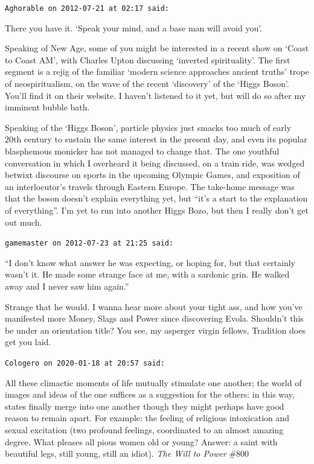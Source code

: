 \begin{footnotesize}
\begin{sffamily}
\texttt{Aghorable on 2012-07-21 at 02:17 said:}

There you have it. `Speak your mind, and a base man will avoid you'.

Speaking of New Age, some of you might be interested in a recent show on `Coast to Coast AM', with Charles Upton discussing `inverted spirituality'. The first segment is a rejig of the familiar `modern science approaches ancient truths' trope of neospiritualism, on the wave of the recent `discovery' of the `Higgs Boson'. You'll find it on their website. I haven't listened to it yet, but will do so after my imminent bubble bath.

Speaking of the `Higgs Boson', particle physics just smacks too much of early 20th century to sustain the same interest in the present day, and even its popular blasphemous monicker has not managed to change that. The one youthful conversation in which I overheard it being discussed, on a train ride, was wedged betwixt discourse on sports in the upcoming Olympic Games, and exposition of an interlocutor's travels through Eastern Europe. The take-home message was that the boson doesn't explain everything yet, but ``it's a start to the explanation of everything''. I'm yet to run into another Higgs Bozo, but then I really don't get out much.

\hfill

\texttt{gamemaster on 2012-07-23 at 21:25 said:}

``I don't know what answer he was expecting, or hoping for, but that certainly wasn't it. He made some strange face at me, with a sardonic grin. He walked away and I never saw him again.''

Strange that he would. I wanna hear more about your tight ass, and how you've manifested more Money, Slags and Power since discovering Evola. Shouldn't this be under an orientation title? You see, my asperger virgin fellows, Tradition does get you laid.

\hfill

\texttt{Cologero on 2020-01-18 at 20:57 said:}

All these climactic moments of life mutually stimulate one another; the world of images and ideas of the one suffices as a suggestion for the others: in this way, states finally merge into one another though they might perhaps have good reason to remain apart. For example: the feeling of religious intoxication and sexual excitation (two profound feelings, coordinated to an almost amazing degree. What pleases all pious women old or young? Answer: a saint with beautiful legs, still young, still an idiot). \emph{The Will to Power} \#800


\end{sffamily}
\end{footnotesize}
